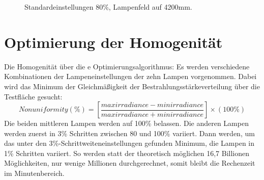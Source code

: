 \documentclass[a4paper,bibtotoc,oneside]{scrbook}
\begin{document}
\begin{figure} [htbp]
\caption{Standardeinstellungen 80\%, Lampenfeld auf 4200mm.}
\label{h80}
\end{figure}

\FloatBarrier

\section{Optimierung der Homogenität}

Die Homogenität über die e Optimierungsalgorithmus: Es werden verschiedene Kombinationen der Lampeneinstellungen der zehn Lampen vorgenommen. Dabei wird das Minimum der Gleichmäßigkeit der Bestrahlungsstärkeverteilung über die Testfläche gesucht:
\begin{equation}
 Nonuniformity (\%) = [\frac{max irradiance - min irradiance}{max irradiance + min irradiance}] \times (100\%)
\end{equation}
Die beiden mittleren Lampen werden auf 100\% belassen. Die anderen Lampen werden zuerst in 3\% Schritten zwischen 80 und 100\% variiert. Dann werden, um das unter den 3\%-Schrittweiteneinstellungen gefunden Minimum, die Lampen in 1\% Schritten variiert. So werden statt der theoretisch möglichen 16,7 Billionen Möglichkeiten, nur wenige Millionen durchgerechnet, somit bleibt die Rechenzeit im Minutenbereich.
\end{document}
